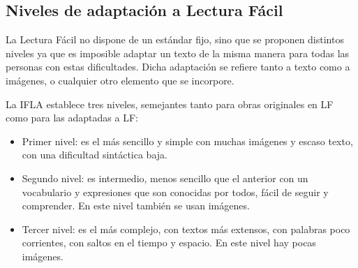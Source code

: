 

\subsection{Niveles de adaptación a Lectura Fácil}
La Lectura Fácil no dispone de un estándar fijo, sino que se proponen distintos niveles ya que es imposible adaptar un texto de la misma manera para todas las personas con estas dificultades. Dicha adaptación se refiere tanto a texto como a imágenes, o cualquier otro elemento que se incorpore.

La IFLA establece tres niveles, semejantes
tanto para obras originales en LF como para las adaptadas a LF:
\begin{itemize}
	\item Primer nivel: es el más sencillo y simple con muchas imágenes y escaso texto, con una dificultad sintáctica baja.
	\item Segundo nivel: es intermedio, menos sencillo que el anterior con un vocabulario y expresiones que son conocidas por todos, fácil de seguir y comprender. En este nivel también se usan imágenes.
	\item Tercer nivel: es el más complejo, con textos más extensos, con palabras poco corrientes, con saltos en el tiempo y espacio. En este nivel hay pocas imágenes.
\end{itemize}

